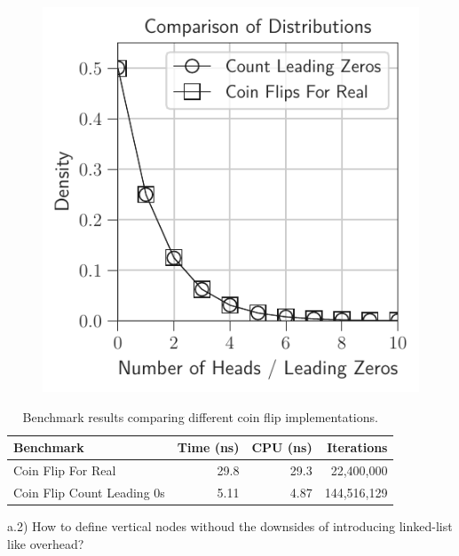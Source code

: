 \documentclass[12pt]{article}
\begin{document}
\begin{figure}[H]
\begin{minipage}{0.32\textwidth}
		\label{fig:coin_flips_count_leading}
	\end{minipage}\hfill
	\begin{minipage}{0.32\textwidth}
		\centering
		\includegraphics[width=\linewidth]{../notebook/plot/comparison_of_distributions.pdf}
		\label{fig:coin_flips_comparison}
	\end{minipage}
\end{figure}


\begin{table}[h]
	\centering
	\small
	\begin{tabular}{lrrr}
		\hline
		\textbf{Benchmark} & \textbf{Time (ns)} & \textbf{CPU (ns)} & \textbf{Iterations} \\
		\hline
		Coin Flip For Real & 29.8 & 29.3 & 22,400,000 \\
		\hline
		Coin Flip Count Leading 0s & 5.11 & 4.87 & 144,516,129 \\
	\end{tabular}
	\caption{Benchmark results comparing different coin flip implementations.}
	\label{tab:benchmark_results}
\end{table}


a.2) How to define vertical nodes withoud the downsides of introducing linked-list like overhead? \\
\end{document}

